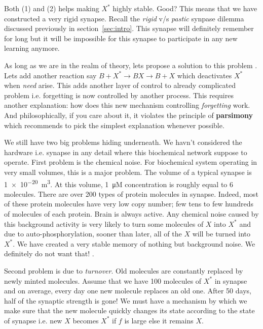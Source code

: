 \documentclass[]{resonance}
\begin{document}
{Both (1) and (2) helps making $X^*$ highly stable. Good? This means that we have
constructed a very rigid synapse. Recall the \textit{rigid} v/s \textit{pastic}
synpase dilemma discussed previously in section~\ref{sec:intro}. This synapse
will definitely remember for long but it will be impossible for this synapse to
participate in any new learning anymore.

As long as we are in the realm of theory, lets propose a solution to this
problem .  Lets add another reaction say $B+X^*\rightarrow BX \rightarrow B+X$
which deactivates $X^*$ when \textit{need} arise. This adds another layer of
control to already complicated problem i.e. forgetting is now controlled by
another process. This requires another explanation: how does this new mechanism
controlling \textit{forgetting} work. And philosophically, if you care about it,
it violates the principle of \textbf{parsimony} which recommends to pick the
simplest explanation whenever possible. 

 We still have two big problems hiding underneath.
We havn't considered the hardware i.e. synapse in any detail where this
biochemical network suppose to operate. First problem is the chemical noise. For
biochemical system operating in very small volumes, this is a major problem. The
volume of a typical synapse is \SI{1e-20}{\cubic\meter}. At this volume,
\SI{1}{\micro M} concentration is roughly equal to 6 molecules. There are over
200 types of protein molecules in synapse. Indeed, most of these protein
molecules have very low copy number; few tens to few hundreds of molecules of
each protein. Brain is always active. Any chemical noise caused by this
background activity is very likely to turn some molecules of $X$ into $X^*$ and
due to auto-phosphorylation, sooner than later, all of the $X$ will be turned
into $X^*$. We have created a very stable memory of nothing but background
noise. We definitely do not want that!  .

Second problem is due to \textit{turnover}. Old molecules are constantly
replaced by newly minted molecules. Assume that we have 100 molecules of $X^*$
in synapse and on average, every day one new molecule replaces an old one.
After 50 days, half of the synaptic strength is gone! We must have a mechanism
by which we make sure that the new molecule quickly changes its state according
to the state of synapse i.e. new $X$ becomes $X^*$ if $f$ is large else it
remains $X$. 

}
\end{document}
